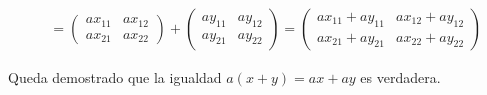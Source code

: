 \begin{exercise}[ Sea $a\in \R$, $x=\begin{pmatrix}
				x_{11}&x_{12}\\x_{21}&x_{22}\end{pmatrix}$ y $y=\begin{pmatrix}
				y_{11}&y_{12}\\y_{21}&y_{22}\end{pmatrix}$, $x,y\in M_{2\times 2}(\R)$]
\begin{align*}
		 & =\begin{pmatrix}
			    ax_{11}&ax_{12}\\ax_{21}&ax_{22}\end{pmatrix}+\begin{pmatrix}
			                                                  ay_{11}&ay_{12}\\ay_{21}&ay_{22}\end{pmatrix}=\begin{pmatrix}
			                                                                                                ax_{11}+ay_{11}&ax_{12}+ay_{12}\\ax_{21}+ay_{21}&ax_{22}+ay_{22}\end{pmatrix}
	\end{align*}


	Queda demostrado que la igualdad $a(x+y)=ax+ay$ es verdadera.
\end{exercise}


